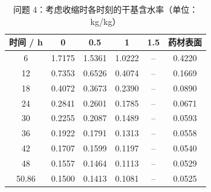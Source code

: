 \begin{table}[htbp]
\centering
\caption{问题 4：考虑收缩时各时刻的干基含水率（单位：kg/kg）}
\label{table_06_p4_moisture}
\begin{tabular}{cccccc}
\toprule
时间 / h & 0 & 0.5 & 1 & 1.5 & 药材表面 \\
\midrule
6 & 1.7175 & 1.5361 & 1.0222 & -- & 0.4220 \\
12 & 0.7353 & 0.6526 & 0.4074 & -- & 0.1669 \\
18 & 0.4072 & 0.3673 & 0.2390 & -- & 0.0890 \\
24 & 0.2841 & 0.2601 & 0.1785 & -- & 0.0671 \\
30 & 0.2255 & 0.2087 & 0.1489 & -- & 0.0593 \\
36 & 0.1922 & 0.1791 & 0.1313 & -- & 0.0558 \\
42 & 0.1707 & 0.1599 & 0.1197 & -- & 0.0540 \\
48 & 0.1557 & 0.1464 & 0.1113 & -- & 0.0529 \\
50.86 & 0.1500 & 0.1413 & 0.1081 & -- & 0.0525 \\
\bottomrule
\end{tabular}
\end{table}
